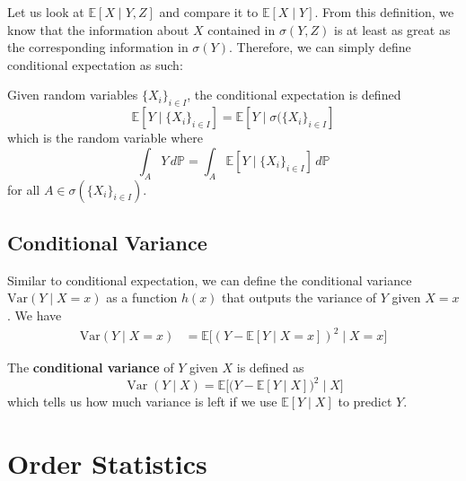 \documentclass{article}
\DeclareMathOperator{\Var}{Var}
\begin{document}
    Let us look at $\mathbb{E}[X \mid Y, Z]$ and compare it to $\mathbb{E}[X \mid Y]$. From this definition, we know that the information about $X$ contained in $\sigma(Y, Z)$ is at least as great as the corresponding information in $\sigma(Y)$. Therefore, we can simply define conditional expectation as such: 

    \begin{definition}
      Given random variables $\{X_i\}_{i \in I}$, the conditional expectation is defined 
      \begin{equation}
        \mathbb{E}[Y \mid \{X_i\}_{i \in I} ] = \mathbb{E}[ Y \mid \sigma(\{X_i \}_{i \in I}]
      \end{equation}
      which is the random variable where 
      \begin{equation}
        \int_A Y \, d\mathbb{P} = \int_A \mathbb{E}[Y \mid \{X_i\}_{i \in I} ] \, d\mathbb{P}
      \end{equation}
      for all $A \in \sigma(\{X_i \}_{i \in I})$. 
    \end{definition}

  \subsection{Conditional Variance}

    Similar to conditional expectation, we can define the conditional variance $\mathrm{Var}(Y \mid X = x)$ as a function $h(x)$ that outputs the variance of $Y$ given $X = x$. We have
    \begin{align}
      \mathrm{Var}(Y \mid X = x) & = \mathbb{E}\big[ ( Y - \mathbb{E}[Y \mid X = x] )^2 \mid X = x \big]
    \end{align}

    \begin{definition}
      The \textbf{conditional variance} of $Y$ given $X$ is defined as 
      \begin{equation}
        \Var(Y \mid X) = \mathbb{E} \big[ \big( Y - \mathbb{E}[Y \mid X] \big)^2 \mid X \big]
      \end{equation}
      which tells us how much variance is left if we use $\mathbb{E}[Y \mid X]$ to predict $Y$. 
    \end{definition}

\section{Order Statistics}
\end{document}
